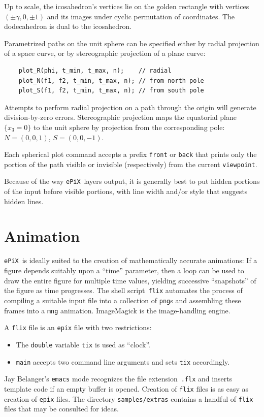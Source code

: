 \documentclass[12pt]{report}
\newcommand{\code}[1]{\texttt{#1}}
\newcommand{\filename}[1]{\texttt{#1}}
\newcommand{\ePiX}{\code{ePiX}}
\begin{document}
Up to scale, the icosahedron's vertices lie on the golden rectangle
with vertices $(\pm\gamma,0,\pm1)$ and its images under cyclic
permutation of coordinates. The dodecahedron is dual to the
icosahedron.

Parametrized paths on the unit sphere can be specified either by
radial projection of a space curve, or by stereographic projection of
a plane curve:
\begin{verbatim}
    plot_R(phi, t_min, t_max, n);    // radial
    plot_N(f1, f2, t_min, t_max, n); // from north pole
    plot_S(f1, f2, t_min, t_max, n); // from south pole
\end{verbatim}
Attempts to perform radial projection on a path through the origin
will generate division-by-zero errors. Stereographic projection maps
the equatorial plane $\{x_3=0\}$ to the unit sphere by projection from
the corresponding pole: $N=(0,0,1)$, $S=(0,0,-1)$.

Each spherical plot command accepts a prefix \code{front} or
\code{back} that prints only the portion of the path visible or
invisible (respectively) from the current \code{viewpoint}.

Because of the way \ePiX\ layers output, it is generally best to put
hidden portions of the input before visible portions, with line width
and/or style that suggests hidden lines.


\section{Animation}

\label{section:animation}
\ePiX\ is ideally suited to the creation of mathematically accurate
animations: If a figure depends suitably upon a ``time'' parameter,
then a loop can be used to draw the entire figure for multiple time
values, yielding successive ``snapshots'' of the figure as time
progresses. The shell script~\code{flix} automates the process of
compiling a suitable input file into a collection of \filename{png}s
and assembling these frames into a \filename{mng} animation.
ImageMagick is the image-handling engine.

A \code{flix} file is an \code{epix} file with two restrictions:
\begin{itemize}
  \item The \code{double} variable \code{tix} is used as
  ``clock''.

  \item \code{main} accepts two command line arguments and sets
  \code{tix} accordingly.
\end{itemize}
Jay Belanger's \code{emacs} mode recognizes the file
extension~\filename{.flx} and inserts template code if an empty
buffer is opened. Creation of \code{flix} files is as easy as creation
of \code{epix} files.  The directory \filename{samples/extras}
contains a handful of \code{flix} files that may be consulted for
ideas.
\end{document}

